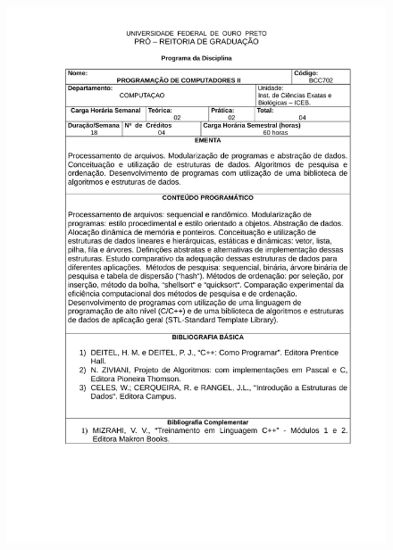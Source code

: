 \begin{figure}[p]
	\centering 
	\includegraphics[scale=0.7]{capitulos/anexo1-programas-disciplina/p21.pdf}
\end{figure}

